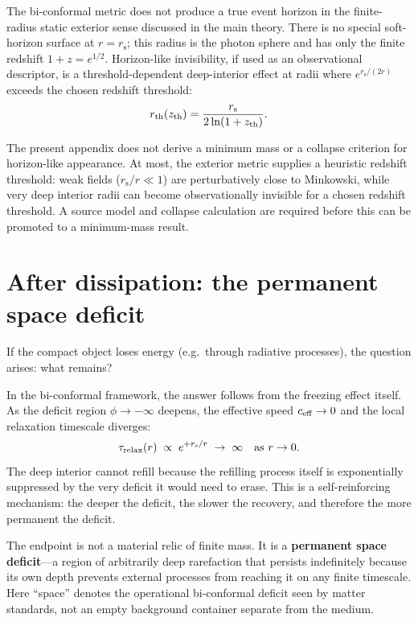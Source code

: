 \documentclass[11pt]{article}
\newcommand{\rs}{r_{\mathrm{s}}}
\begin{document}
The bi-conformal metric does not produce a true event horizon in the finite-radius static exterior sense discussed in the main theory. There is no special soft-horizon surface at $r = \rs$; this radius is the photon sphere and has only the finite redshift $1+z=e^{1/2}$. Horizon-like invisibility, if used as an observational descriptor, is a threshold-dependent deep-interior effect at radii where $e^{\rs/(2r)}$ exceeds the chosen redshift threshold:
\begin{equation}
r_{\rm th}(z_{\rm th})=\frac{\rs}{2\ln(1+z_{\rm th})}.
\end{equation}

The present appendix does not derive a minimum mass or a collapse criterion for horizon-like appearance. At most, the exterior metric supplies a heuristic redshift threshold: weak fields ($\rs/r \ll 1$) are perturbatively close to Minkowski, while very deep interior radii can become observationally invisible for a chosen redshift threshold. A source model and collapse calculation are required before this can be promoted to a minimum-mass result.

\section{After dissipation: the permanent space deficit}\label{sec:permanent}

If the compact object loses energy (e.g.\ through radiative processes), the question arises: what remains?

In the bi-conformal framework, the answer follows from the freezing effect itself. As the deficit region $\phi \to -\infty$ deepens, the effective speed $c_{\rm eff} \to 0$ and the local relaxation timescale diverges:
\begin{equation}
\tau_{\rm relax}(r) \;\propto\; e^{+\rs/r} \;\to\; \infty \quad\text{as } r \to 0.
\end{equation}
The deep interior cannot refill because the refilling process itself is exponentially suppressed by the very deficit it would need to erase. This is a self-reinforcing mechanism: the deeper the deficit, the slower the recovery, and therefore the more permanent the deficit.

The endpoint is not a material relic of finite mass. It is a \textbf{permanent space deficit}---a region of arbitrarily deep rarefaction that persists indefinitely because its own depth prevents external processes from reaching it on any finite timescale. Here ``space'' denotes the operational bi-conformal deficit seen by matter standards, not an empty background container separate from the medium.
\end{document}
